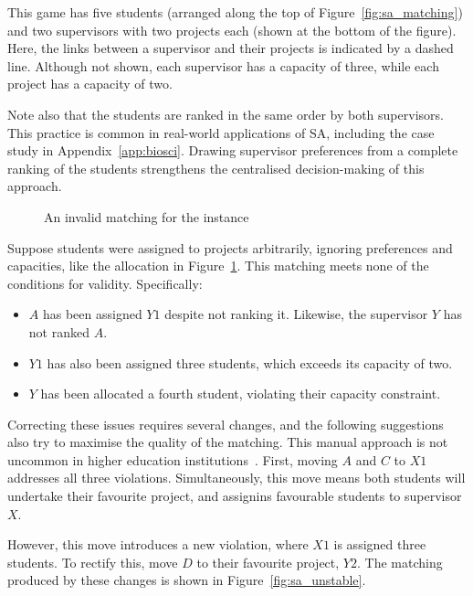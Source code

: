 This game has five students (arranged along the top of
Figure~\ref{fig:sa_matching}) and two supervisors with two projects each (shown
at the bottom of the figure). Here, the links between a supervisor and their
projects is indicated by a dashed line. Although not shown, each supervisor has
a capacity of three, while each project has a capacity of two.

Note also that the students are ranked in the same order by both supervisors.
This practice is common in real-world applications of SA, including the case
study in Appendix~\ref{app:biosci}. Drawing supervisor preferences from a
complete ranking of the students strengthens the centralised decision-making of
this approach.

\begin{figure}[htbp]
    \centering
    \resizebox{\imgwidth}{!}{%
        
    }\caption{An invalid matching for the instance}\label{fig:sa_invalid}
\end{figure}

Suppose students were assigned to projects arbitrarily, ignoring preferences and
capacities, like the allocation in Figure~\ref{fig:sa_invalid}. This matching
meets none of the conditions for validity. Specifically:

\begin{itemize}
    \item \(A\) has been assigned \(Y1\) despite not ranking it. Likewise, the
        supervisor \(Y\) has not ranked \(A\).
    \item \(Y1\) has also been assigned three students, which exceeds its
        capacity of two.
    \item \(Y\) has been allocated a fourth student, violating their capacity
        constraint.
\end{itemize}

Correcting these issues requires several changes, and the following suggestions
also try to maximise the quality of the matching. This manual approach is not
uncommon in higher education institutions~\cite{Hussain2019}. First, moving
\(A\) and \(C\) to \(X1\) addresses all three violations. Simultaneously, this
move means both students will undertake their favourite project, and assignins
favourable students to supervisor \(X\).

However, this move introduces a new violation, where \(X1\) is assigned three
students. To rectify this, move \(D\) to their favourite project, \(Y2\). The
matching produced by these changes is shown in Figure~\ref{fig:sa_unstable}.

